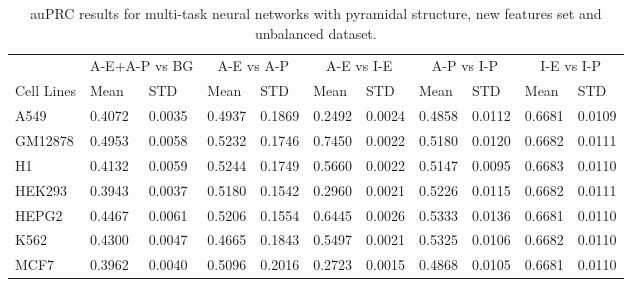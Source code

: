 \begin{table}[!htbp]
\centering
\caption{auPRC results for multi-task neural networks with pyramidal structure, new features set and unbalanced dataset.}
\label{tab:newfeatures_auprc}
\hspace*{-2.2cm}
\begin{tabular}[t]{*{11}{l}}
\toprule
 & \multicolumn{2}{c}{A-E+A-P vs BG} & \multicolumn{2}{c}{A-E vs A-P} & \multicolumn{2}{c}{A-E vs I-E} & \multicolumn{2}{c}{A-P vs I-P} & \multicolumn{2}{c}{I-E vs I-P} \\
\cmidrule(lr){2-3}
\cmidrule(lr){4-5}
\cmidrule(lr){6-7}
\cmidrule(lr){8-9}
\cmidrule(lr){10-11}
Cell Lines & Mean & STD & Mean & STD & Mean & STD & Mean & STD & Mean & STD \\
\midrule
A549  & 0.4072 & 0.0035 & 0.4937 & 0.1869 & 0.2492 & 0.0024 & 0.4858 & 0.0112 & 0.6681 & 0.0109\\
GM12878  & 0.4953 & 0.0058 & 0.5232 & 0.1746 & 0.7450 & 0.0022 & 0.5180 & 0.0120 & 0.6682 & 0.0111\\
H1  & 0.4132 & 0.0059 & 0.5244 & 0.1749 & 0.5660 & 0.0022 & 0.5147 & 0.0095 & 0.6683 & 0.0110\\
HEK293  & 0.3943 & 0.0037 & 0.5180 & 0.1542 & 0.2960 & 0.0021 & 0.5226 & 0.0115 & 0.6682 & 0.0111\\
HEPG2  & 0.4467 & 0.0061 & 0.5206 & 0.1554 & 0.6445 & 0.0026 & 0.5333 & 0.0136 & 0.6681 & 0.0110\\
K562  & 0.4300 & 0.0047 & 0.4665 & 0.1843 & 0.5497 & 0.0021 & 0.5325 & 0.0106 & 0.6682 & 0.0110\\
MCF7  & 0.3962 & 0.0040 & 0.5096 & 0.2016 & 0.2723 & 0.0015 & 0.4868 & 0.0105 & 0.6681 & 0.0110\\
\bottomrule
\end{tabular}
\hspace*{-2.2cm}
\end{table}

